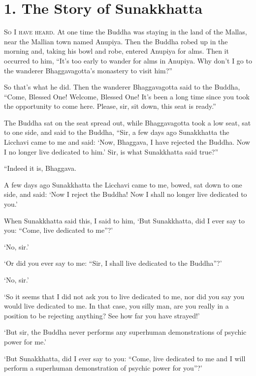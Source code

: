 \documentclass[12pt,openany]{book}%
\newcommand*{\scevam}[1]{\textsc{#1}}
\begin{document}
\section*{1. The Story of Sunakkhatta }

\scevam{So I have heard. }At one time the Buddha was staying in the land of the Mallas, near the Mallian town named Anupiya. Then the Buddha robed up in the morning and, taking his bowl and robe, entered Anupiya for alms. Then it occurred to him, “It’s too early to wander for alms in Anupiya. Why don’t I go to the wanderer Bhaggavagotta’s monastery to visit him?” 

So that’s what he did. Then the wanderer Bhaggavagotta said to the Buddha, “Come, Blessed One! Welcome, Blessed One! It’s been a long time since you took the opportunity to come here. Please, sir, sit down, this seat is ready.” 

The Buddha sat on the seat spread out, while Bhaggavagotta took a low seat, sat to one side, and said to the Buddha, “Sir, a few days ago Sunakkhatta the Licchavi came to me and said: ‘Now, Bhaggava, I have rejected the Buddha. Now I no longer live dedicated to him.’ Sir, is what Sunakkhatta said true?” 

“Indeed it is, Bhaggava. 

A few days ago Sunakkhatta the Licchavi came to me, bowed, sat down to one side, and said: ‘Now I reject the Buddha! Now I shall no longer live dedicated to you.’ 

When Sunakkhatta said this, I said to him, ‘But Sunakkhatta, did I ever say to you: “Come, live dedicated to me”?’ 

‘No, sir.’ 

‘Or did you ever say to me: “Sir, I shall live dedicated to the Buddha”?’ 

‘No, sir.’ 

‘So it seems that I did not ask you to live dedicated to me, nor did you say you would live dedicated to me. In that case, you silly man, are you really in a position to be rejecting anything? See how far you have strayed!’ 

‘But sir, the Buddha never performs any superhuman demonstrations of psychic power for me.’ 

‘But Sunakkhatta, did I ever say to you: “Come, live dedicated to me and I will perform a superhuman demonstration of psychic power for you”?’ 
\end{document}
